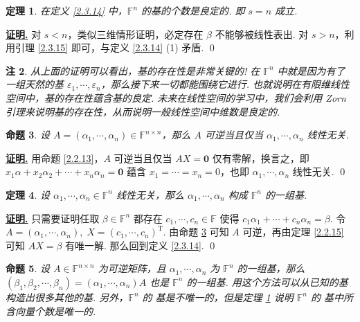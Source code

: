 \documentclass[10pt,openany]{article}
\theoremstyle{thmstyle} %
\newtheorem{theorem}{定理}[subsection]
\theoremstyle{defstyle} %
\theoremstyle{prostyle} %
\newtheorem{proposition}[theorem]{命题}
\theoremstyle{exastyle}
\theoremstyle{remstyle}
\newtheorem{remark}[theorem]{注}
\renewenvironment{proof}[1][证明]{\par\underline{\textbf{#1.}} \;\fangsong}{\qed\par}
\newcommand{\T}{^{\text{T}}}
\newcommand{\F}{\mathbb{F}}
\newcommand{\n}{^{n \times n}}
\begin{document}
\begin{theorem}\label{2.3.16}
	在定义 \ref{2.3.14} 中，\( \F^n \) 的基的个数是良定的. 即 \( s=n \) 成立.
\end{theorem}

\begin{proof}
	对 \( s<n \)，类似三维情形证明，必定存在 \( \beta \) 不能够被线性表出. 对 \( s>n \)，利用引理 \ref{2.3.15} 即可，与定义 \ref{2.3.14} (1) 矛盾.
\end{proof}

\begin{remark}
	从上面的证明可以看出，基的存在性是非常关键的! 在 \( \F^n \) 中就是因为有了一组天然的基 \( \varepsilon_1,\cdots,\varepsilon_n \)，那么接下来一切都能围绕它进行. 也就说明在有限维线性空间中，基的存在性蕴含基的良定. 未来在线性空间的学习中，我们会利用 Zorn 引理来说明基的存在性，从而说明一般线性空间中维数是良定的.
\end{remark}

\begin{proposition} \label{2.3.18}
	设 \( A=(\alpha_1,\cdots,\alpha_n) \in \F^{n \times n} \)，那么 \( A \) 可逆当且仅当 \( \alpha_1,\cdots,\alpha_n \) 线性无关. 
\end{proposition}

\begin{proof}
	用命题 \ref{2.2.13}，\( A \) 可逆当且仅当 \( AX=\bm{0} \) 仅有零解，换言之，即 \( x_1\alpha+x_2\alpha_2+\cdots+x_n\alpha_n=\bm{0} \) 蕴含 \( x_1=\cdots=x_n=0 \)，也即 \( \alpha_1,\cdots,\alpha_n \) 线性无关. 
\end{proof}

\begin{theorem} \label{2.3.19}
	设 \( \alpha_1,\cdots,\alpha_n \in \F^n \) 线性无关，那么 \( \alpha_1,\cdots,\alpha_n \) 构成 \( \F^n \) 的一组基. 
\end{theorem}

\begin{proof}
	只需要证明任取 \( \beta \in \F^n \) 都存在 \( c_1,\cdots,c_n \in \F \) 使得 \( c_1\alpha_1+\cdots+c_n\alpha_n=\beta \). 令 \( A=(\alpha_1,\cdots,\alpha_n), \; X=(c_1,\cdots,c_n)\T \). 由命题 \ref{2.3.18} 可知 \( A \) 可逆，再由定理 \ref{2.2.15} 可知 \( AX=\beta \) 有唯一解. 那么回到定义 \ref{2.3.14}.
\end{proof}

\begin{proposition} \label{2.3.20}
	设 \( A \in \F\n \) 为可逆矩阵，且 \( \alpha_1,\cdots,\alpha_n \) 为 \( \F^n \) 的一组基，那么 \( (\beta_1,\beta_2,\cdots,\beta_n)=(\alpha_1,\cdots,\alpha_n)A \) 也是  \( \F^n \) 的一组基. 用这个方法可以从已知的基构造出很多其他的基. 另外，\( \F^n \) 的 基是不唯一的，但是定理 \ref{2.3.16} 说明 \( \F^n \) 的 基中所含向量个数是唯一的.
\end{proposition}
\end{document}
